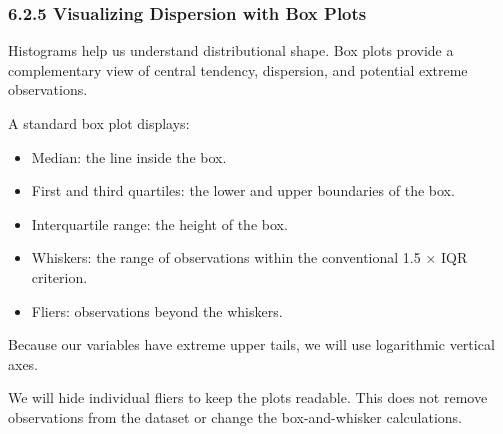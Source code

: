 \documentclass[11pt]{article}
\providecommand{\tightlist}{%
      \setlength{\itemsep}{0pt}\setlength{\parskip}{0pt}}
\begin{document}
    \subsubsection{6.2.5 Visualizing Dispersion with Box
Plots}\label{visualizing-dispersion-with-box-plots}

Histograms help us understand distributional shape. Box plots provide a
complementary view of central tendency, dispersion, and potential
extreme observations.

A standard box plot displays:

\begin{itemize}
\tightlist
\item
  Median: the line inside the box.
\item
  First and third quartiles: the lower and upper boundaries of the box.
\item
  Interquartile range: the height of the box.
\item
  Whiskers: the range of observations within the conventional 1.5 × IQR
  criterion.
\item
  Fliers: observations beyond the whiskers.
\end{itemize}

Because our variables have extreme upper tails, we will use logarithmic
vertical axes.

We will hide individual fliers to keep the plots readable. This does not
remove observations from the dataset or change the box-and-whisker
calculations.
\end{document}
